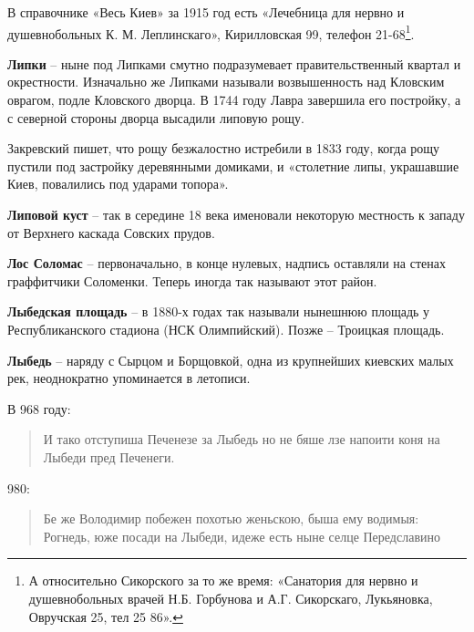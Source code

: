 В справочнике «Весь Киев» за 1915 год есть «Лечебница для нервно и душевнобольных К. М. Леплинскаго», Кирилловская 99, телефон 21-68\footnote{А относительно Сикорского за то же время: «Санатория для нервно и душевнобольных врачей Н.Б. Горбунова и А.Г. Сикорскаго, Лукьяновка, Овручская 25, тел 25 86».}.\\

\medskip

\textbf{Липки} – ныне под Липками смутно подразумевает правительственный квартал и окрестности. Изначально же Липками называли возвышенность над Кловским оврагом, подле Кловского дворца. В 1744 году Лавра завершила его постройку, а с северной стороны дворца высадили липовую рощу.

Закревский пишет, что рощу безжалостно истребили в 1833 году, когда рощу пустили под застройку деревянными домиками, и «столетние липы, украшавшие Киев, повалились под ударами топора».\\

\medskip


\textbf{Липовой куст} – так в середине 18 века именовали некоторую местность к западу от Верхнего каскада Совских прудов.\\

\medskip

\textbf{Лос Соломас} – первоначально, в конце нулевых, надпись оставляли на стенах граффитчики Соломенки. Теперь иногда так называют этот район.\\

\medskip

\textbf{Лыбедская площадь} – в 1880-х годах так называли нынешнюю площадь у Республиканского стадиона (НСК Олимпийский). Позже – Троицкая площадь.\\

\medskip


\textbf{Лыбедь} – наряду с Сырцом и Борщовкой, одна из крупнейших киевских малых рек, неоднократно упоминается в летописи.

В 968 году:

\begin{quotation}
\noindent И тако отступиша Печенезе за Лыбедь но не бяше лзе напоити коня на Лыбеди пред Печенеги.
\end{quotation}

980:

\begin{quotation}
\noindent Бе же Володимир побежен похотью женьскою, быша ему водимыя: Рогнедь, юже посади на Лыбеди, идеже есть ныне селце Передславино
\end{quotation}

